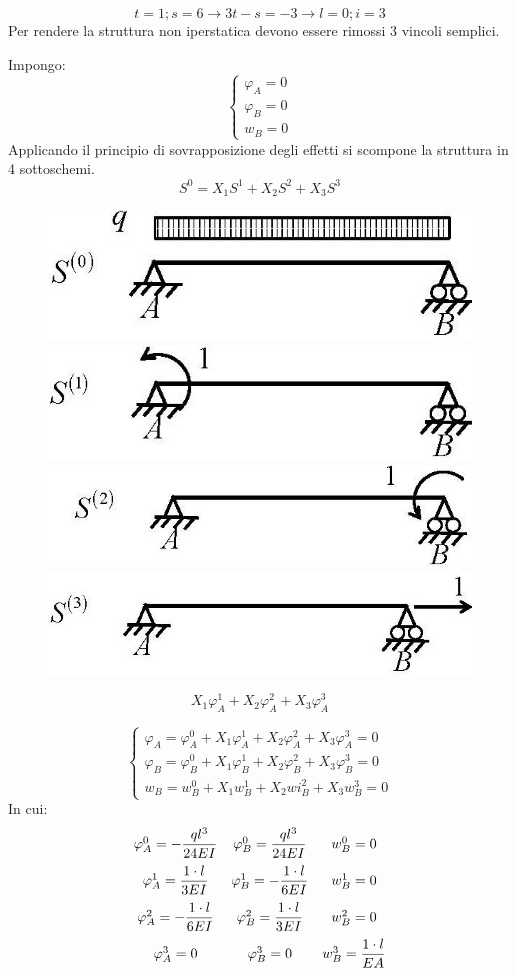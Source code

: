 \documentclass{article}
\begin{document}
\begin{adjustwidth}{2in}{}
		\[ t =1; s = 6 \rightarrow 3t-s = -3 \rightarrow l = 0; i = 3 \]
		Per rendere la struttura non iperstatica devono essere rimossi 3 vincoli semplici. 
		
		Impongo: 
		\[
		\begin{cases}
				\varphi_A = 0 \\
				\varphi_B = 0 \\
				w_B = 0
		\end{cases}
		\]
		Applicando il principio di sovrapposizione degli effetti si scompone la struttura in 4 sottoschemi. 
		\[ 	S^0 = X_1S^1 + X_2S^2 + X_3S^3\]
		
\begin{figure}[H]
	\centering
	\includegraphics[width=0.4\linewidth]{"immagini/1.PARTE8_Pagina_57 (2)"}
	\includegraphics[width=0.4\linewidth]{"immagini/1.PARTE8_Pagina_57 (3)"}	
	\includegraphics[width=0.4\linewidth]{"immagini/1.PARTE8_Pagina_57 (4)"}	
	\includegraphics[width=0.4\linewidth]{"immagini/1.PARTE8_Pagina_57 (5)"}		
\end{figure}

		\[X_1\varphi_A^1 + X_2\varphi_A^2 + X_3\varphi_A^3\]

		\[
		\begin{cases}
			\varphi_A = \varphi_A^0 + X_1\varphi_A^1 + X_2\varphi_A^2 + X_3\varphi_A^3 = 0 \\
			\varphi_B = \varphi_B^0 + X_1\varphi_B^1 + X_2\varphi_B^2 + X_3\varphi_B^3 = 0 \\
			w_B = w_B^0 + X_1w_B^1 + X_2wi_B^2 + X_3w_B^3 = 0
		\end{cases}
		\]
		In cui: 
		\[
		\begin{matrix}			
				\varphi_A^0 = -\dfrac{ql^3}{24EI} & \varphi_B^0 = \dfrac{ql^3}{24EI} & w_B^0 = 0  \vspace{0.2cm} \\
				\varphi_A^1 = \dfrac{1\cdot l}{3EI} & \varphi_B^1 = -\dfrac{1\cdot l}{6EI} & w_B^1 = 0 \vspace{0.2cm} \\
				\varphi_A^2 = -\dfrac{1\cdot l}{6EI} & \varphi_B^2 = \dfrac{1\cdot l}{3EI} & w_B^2 = 0 \vspace{0.2cm} \\
				\vspace{0.2cm}
				\varphi_A^3 = 0  & \varphi_B^3 = 0 & w_B^3 = \dfrac{1\cdot l}{EA} 		
		\end{matrix}
		\]
		

\end{adjustwidth}
\end{document}
